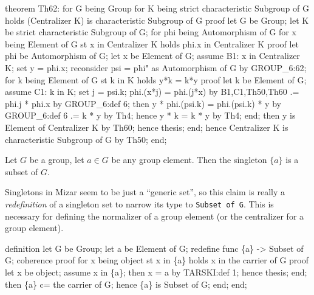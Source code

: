 \nwenddocs{}\endmoddef\nwstartdeflinemarkup{}\nwenddeflinemarkup
theorem Th62:
  for G being Group
  for K being strict characteristic Subgroup of G
  holds (Centralizer K) is characteristic Subgroup of G
proof
  let G be Group;
  let K be strict characteristic Subgroup of G;
  for phi being Automorphism of G
  for x being Element of G
  st x in Centralizer K
  holds phi.x in Centralizer K
  proof
    let phi be Automorphism of G;
    let x be Element of G;
    assume B1: x in Centralizer K;
    set y = phi.x;
    reconsider psi = phi" as Automorphism of G by GROUP_6:62;
    for k being Element of G st k in K holds y*k = k*y
    proof
      let k be Element of G;
      assume C1: k in K;
      set j = psi.k;
      phi.(x*j) = phi.(j*x) by B1,C1,Th50,Th60
               .= phi.j * phi.x by GROUP_6:def 6;
      then y * phi.(psi.k) = phi.(psi.k) * y by GROUP_6:def 6
                          .= k * y by Th4;
      hence y * k = k * y by Th4;
    end;
    then y is Element of Centralizer K by Th60;
    hence thesis;
  end;
  hence Centralizer K is characteristic Subgroup of G by Th50;
end;
\eatline
{}\nwendcode{}\nwdocspar
\begin{definition*}
Let $G$ be a group, let $a\in G$ be any group element. Then the
singleton $\{a\}$ is a subset of $G$.
\end{definition*}

\begin{def-remark}
Singletons in Mizar seem to be just a ``generic set'', so this claim is
really a \emph{redefinition} of a singleton set to narrow its type to
\lstinline{Subset of G}. This is necessary for defining the normalizer
of a group element (or the centralizer for a group element).
\end{def-remark}

\nwenddocs{}\endmoddef\nwstartdeflinemarkup{}\nwenddeflinemarkup
definition
  let G be Group;
  let a be Element of G;
  redefine func \{a\} -> Subset of G;
  coherence
  proof
    for x being object st x in \{a\}
    holds x in the carrier of G
    proof
      let x be object;
      assume x in \{a\};
      then x = a by TARSKI:def 1;
      hence thesis;
    end;
    then \{a\} c= the carrier of G;
    hence \{a\} is Subset of G;
  end;
end;
\nwendcode{}\nwdocspar

